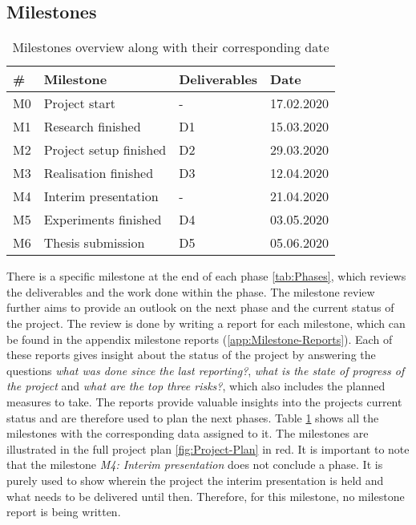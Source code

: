 \subsection{Milestones}
\label{sec:Milestones-Project}
\begin{table}[htb]
    \centering
    \caption{Milestones overview along with their corresponding date}
	\label{tab:Milestones}
    \begin{tabular}{p{} | p{} | p{} | p{}}
        \toprule
        \textbf{\#} & \textbf{Milestone} & \textbf{Deliverables} & \textbf{Date} \\ 
        \midrule[1pt]
        M0 & Project start & - & 17.02.2020\\
        \hline
        M1 & Research finished & D1 & 15.03.2020\\
        \hline
        M2 & Project setup finished & D2 & 29.03.2020\\
        \hline
        M3 & Realisation finished & D3 & 12.04.2020\\
        \hline
        M4 & Interim presentation & - & 21.04.2020\\
        \hline
        M5 & Experiments finished & D4 & 03.05.2020\\
        \hline
        M6 & Thesis submission & D5 & 05.06.2020\\
        \bottomrule
    \end{tabular}
\end{table}
\noindent
There is a specific milestone at the end of each phase \ref{tab:Phases}, which reviews the deliverables and the work done within the phase. The milestone review further aims to provide an outlook on the next phase and the current status of the project. The review is done by writing a report for each milestone, which can be found in the appendix milestone reports (\ref{app:Milestone-Reports}). Each of these reports gives insight about the status of the project by answering the questions \textit{what was done since the last reporting?}, \textit{what is the state of progress of the project} and \textit{what are the top three risks?}, which also includes the planned measures to take. The reports provide valuable insights into the projects current status and are therefore used to plan the next phases. Table \ref{tab:Milestones} shows all the milestones with the corresponding data assigned to it. The milestones are illustrated in the full project plan \ref{fig:Project-Plan} in red.
\newline
\newline
It is important to note that the milestone \textit{M4: Interim presentation} does not conclude a phase. It is purely used to show wherein the project the interim presentation is held and what needs to be delivered until then. Therefore, for this milestone, no milestone report is being written.

